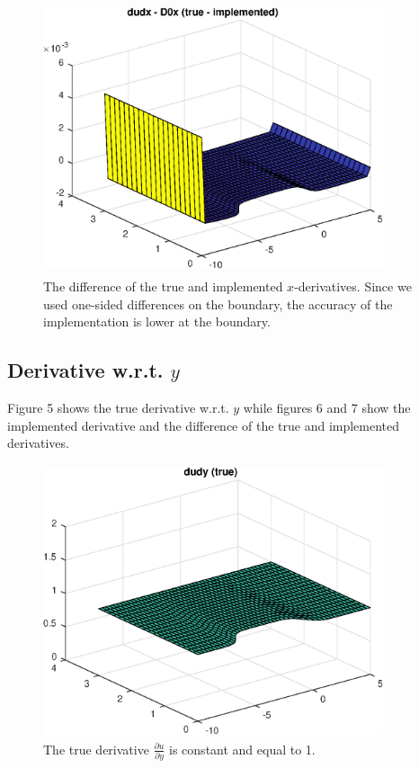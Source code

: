 \documentclass[a4paper,10pt]{article}
\begin{document}
\begin{figure}[ht]
  \centering
  \includegraphics[width = 10cm, height = 8cm]{dudxD0x}
  \begin{minipage}[t]{100mm}
    \caption{
      The difference of the true and implemented $x$-derivatives. Since we used
      one-sided differences on the boundary, the accuracy of the implementation is
      lower at the boundary. 
    }\label{FIG_jjj}
  \end{minipage}
\end{figure}



\FloatBarrier
\subsection*{Derivative w.r.t. $y$}
Figure 5 shows the true derivative w.r.t. $y$ while figures 6 and 7 show the implemented derivative
and the difference of the true and implemented derivatives.
\FloatBarrier

\begin{figure}[ht]
  \centering
  \includegraphics[width = 10cm, height = 8cm]{dudy}
  \begin{minipage}[t]{100mm}
    \caption{
      The true derivative $\tfrac{\partial u}{\partial y}$ is constant and
      equal to 1.
    }\label{FIG_jjj}
  \end{minipage}
\end{figure}
\end{document}
